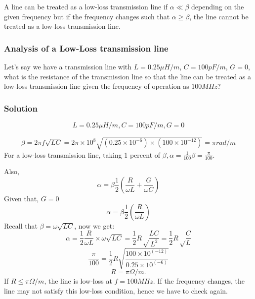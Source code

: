 A line can be treated as a low-loss transmission line if $\alpha \ll \beta$ depending on the given frequency but if the frequency changes such that $\alpha \geq \beta$, the line cannot be treated as a low-loss transmission line.

\begin{exmp}
\subsubsection*{Analysis of a Low-Loss transmission line}\label{lec:lec5}
Let's say we have a transmission line with $L = 0.25\mu H/m$, ${C= 100pF/m}$, $G = 0$, what is the resistance of the transmission line so that the line can be treated as a low-loss transmission line given the frequency of operation as $100MHz$?

\subsubsection*{Solution}
\[L= 0.25\mu H/m,C= 100pF/m, G = 0\]

\begin{dmath*}
\beta = 2\pi f\sqrt{LC}
=2 \pi \times 10^8 \sqrt{(0.25 \times 10^{-6}) \times (100 \times 10^{-12})} = \pi rad/m
\end{dmath*}
For a low-loss transmission line, taking 1 percent of $\beta,
\alpha= \frac{1}{100}\beta = \frac{\pi}{100}$.

Also,
\begin{equation*}
\alpha = \beta\frac{1}{2} \left(\frac{R}{\omega L} + \frac{G}{\omega C}\right)
\end{equation*}
Given that, \(G=0\)
\begin{equation*}
\alpha = \beta\frac{1}{2} \left(\frac{R}{\omega L}\right)
\end{equation*}
Recall that $\beta = \omega\sqrt{LC} $, now we get:
\begin{dmath*}
\alpha = \frac{1}{2}\frac{R}{\omega L} \times \omega\sqrt{LC} = \frac{1}{2} R \sqrt \frac{LC}{L^{2}} = \frac{1}{2} R \sqrt \frac{C}{L}
\end{dmath*}
\begin{equation*}
\frac{\pi}{100} = \frac{1}{2} R \sqrt{\frac{100 \times 10^{(-12)}}{0.25 \times 10^{(-6)}}}
\end{equation*}
\begin{equation*}
R=\pi\Omega/m.
\end{equation*}
If $R \leq \pi\Omega/m$, the line is low-loss at $ f= 100MHz$. If the frequency changes, the line may not satisfy this low-loss condition, hence we have to check again.
\end{exmp}

